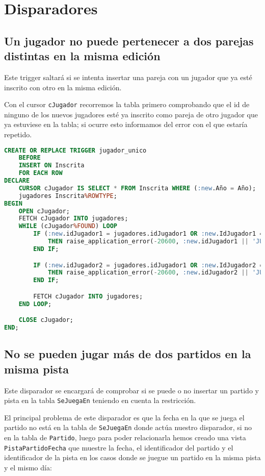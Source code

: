 \section{Disparadores}

\subsection{Un jugador no puede pertenecer a dos parejas distintas en la misma edición}
Este trigger saltará si se intenta insertar una pareja con un jugador que ya esté
inscrito con otro en la misma edición.

Con el cursor \texttt{cJugador} recorremos la tabla primero comprobando que el
id de ninguno de los nuevos jugadores esté ya inscrito como pareja de otro jugador
que ya estuviese en la tabla; si ocurre esto informamos del error con el que estaría repetido.


\begin{lstlisting}[language=sql]
CREATE OR REPLACE TRIGGER jugador_unico
	BEFORE
	INSERT ON Inscrita
	FOR EACH ROW
DECLARE
	CURSOR cJugador IS SELECT * FROM Inscrita WHERE (:new.Año = Año);
	jugadores Inscrita%ROWTYPE;
BEGIN
	OPEN cJugador;
	FETCH cJugador INTO jugadores;
	WHILE (cJugador%FOUND) LOOP
		IF (:new.idJugador1 = jugadores.idJugador1 OR :new.IdJugador1 = jugadores.idJugador2)
			THEN raise_application_error(-20600, :new.idJugador1 || 'JUGADOR 1: No se puede pertenecer a más de una pareja en la misma edicion');
		END IF;

		IF (:new.idJugador2 = jugadores.idJugador1 OR :new.IdJugador2 = jugadores.idJugador2)
			THEN raise_application_error(-20600, :new.idJugador2 || 'JUGADOR 2: No se puede pertenecer a más de una pareja en la misma edicion');
		END IF;

		FETCH cJugador INTO jugadores;
	END LOOP;

	CLOSE cJugador;
END;
\end{lstlisting}

\subsection{No se pueden jugar más de dos partidos en la misma pista}
Este disparador se encargará de comprobar si se puede o no insertar un partido
y pista en la tabla \texttt{SeJuegaEn} teniendo en cuenta la restricción.

El principal problema de este disparador es que la fecha en la que se juega el
partido no está en la tabla de \texttt{SeJuegaEn} donde actúa nuestro disparador,
si no en la tabla de \texttt{Partido}, luego para poder relacionarla hemos creado
una vista \texttt{PistaPartidoFecha} que muestre la fecha, el identificador del
partido y el identificador de la pista en los casos donde se juegue un partido en
la misma pista y el mismo día:

